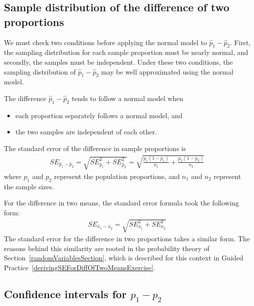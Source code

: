 \subsection{Sample distribution of the difference of two proportions}

We must check two conditions before applying the normal model to $\hat{p}_1 - \hat{p}_2$. First, the sampling distribution for each sample proportion must be nearly normal, and secondly, the samples must be independent. Under these two conditions, the sampling distribution of $\hat{p}_1 - \hat{p}_2$ may be well approximated using the normal model.

\begin{termBox}{
The difference $\hat{p}_1 - \hat{p}_2$ tends to follow a normal model when
\begin{itemize}
\setlength{\itemsep}{0mm}
\item each proportion separately follows a normal model, and
\item the two samples are independent of each other.
\end{itemize}
The standard error of the difference in sample proportions is
\begin{eqnarray}
SE_{\hat{p}_1 - \hat{p}_2}
	= \sqrt{SE_{\hat{p}_1}^2 + SE_{\hat{p}_2}^2}
	= \sqrt{\frac{p_1(1-p_1)}{n_1} + \frac{p_2(1-p_2)}{n_2}}
\label{seForDiffOfProp}
\end{eqnarray}
where $p_1$ and $p_2$ represent the population proportions, and $n_1$ and $n_2$ represent the sample sizes.}
\end{termBox}

For the difference in two means, the standard error formula took the following form:
\begin{eqnarray*}
SE_{\bar{x}_{1} - \bar{x}_{2}} = \sqrt{SE_{\bar{x}_1}^2 + SE_{\bar{x}_2}^2}
\end{eqnarray*}
The standard error for the difference in two proportions takes a similar form. The reasons behind this similarity are rooted in the probability theory of Section~\ref{randomVariablesSection}, which is described for this context in Guided Practice~\vref{derivingSEForDiffOfTwoMeansExercise}.


\subsection{Confidence intervals for $p_1 -p_2$}

